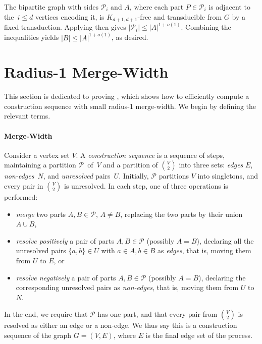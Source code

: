 \documentclass[11pt]{article}
\theoremstyle{definition}
\renewcommand{\le}{\leqslant}
\newcommand{\set}[1]{\{#1\}}
\renewcommand{\cal}{\mathcal}
\begin{document}
The bipartite graph with sides $\cal P_i$ and $A$, where each 
part $P\in\cal P_i$ is adjacent to the~$i\le d$ vertices encoding it, is $K_{d+1,d+1}$-free and transducible from $G$ by a fixed transduction.
Applying  then gives 
$|\cal P_i|\le |A|^{1+o(1)}$. Combining the inequalities yields
$|B|\le |A|^{1+o(1)}$, as desired.



\section{Radius-1 Merge-Width}
\label{sec:merge-width}

This section is dedicated to proving , which shows how to efficiently compute a construction sequence with small radius-1 merge-width. We begin by defining the relevant terms.

\paragraph{Merge-Width}

Consider a vertex set $V$.
A \emph{construction sequence} is a sequence of steps, maintaining a partition $\cal P$~of~$V$ and a partition of  ${V\choose 2}$ into three sets:  
\emph{edges} $E$, \mbox{\emph{non-edges}~$N$},
and \emph{unresolved} pairs~$U$.
 Initially, $\cal P$ partitions $V$ into singletons, and every pair in $V\choose 2$ is unresolved.
In each step, one of three operations is performed:
\begin{itemize}
  \item  \emph{merge} two parts $A,B\in\cal P$, \(A \neq B\), replacing the two parts by their union $A\cup B$, 
  \item \emph{resolve positively} a pair of parts $A,B\in\cal P$ (possibly $A=B$), declaring 
 all the unresolved pairs $\set{a,b}\in U$ with $a\in A,b\in B$ as \emph{edges}, that is, moving them from \(U\) to \(E\), or 
  \item \emph{resolve negatively} a pair of parts $A,B\in\cal P$ (possibly $A=B$), declaring 
     the corresponding unresolved pairs as \emph{non-edges}, that is, moving them from \(U\) to \(N\).
\end{itemize}
In the end, we require that $\cal P$ has one part, and that every pair from ${V\choose 2}$ is resolved as either an edge or a non-edge.
We thus say this is a construction sequence of the graph $G=(V,E)$, where \(E\) is the final edge set of the process. 
\end{document}

